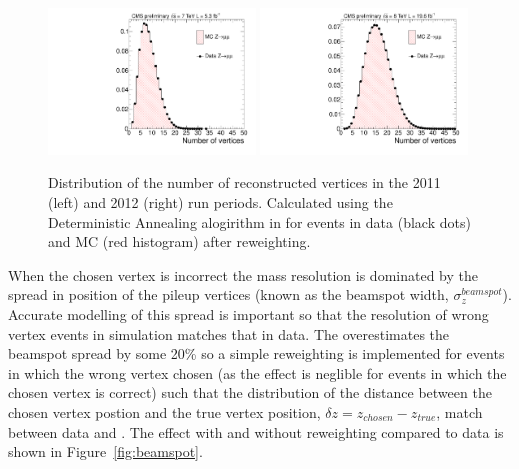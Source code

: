 \begin{figure}
  \begin{center}
  \includegraphics[width=0.49\textwidth]{analysis_comps/plots/nvtx_zmumu_2011.pdf}
  \includegraphics[width=0.49\textwidth]{analysis_comps/plots/nvtx_zmumu_2012.pdf}
  \caption{Distribution of the number of reconstructed vertices in the 2011 (left) and 2012 (right) run periods. Calculated using the Deterministic Annealing alogirithm in  for \Zmumu events in data (black dots) and MC (red histogram) after reweighting.}
  \label{fig:pileup}
  \end{center}
\end{figure}

When the chosen vertex is incorrect the mass resolution is dominated by the spread in position of the pileup vertices (known as the beamspot width, $\sigma_{z}^{beamspot}$). Accurate modelling of this spread is important so that the resolution of wrong vertex events in simulation matches that in data. The \MC overestimates the beamspot spread by some 20\% so a simple reweighting is implemented for \MC events in which the wrong vertex chosen (as the effect is neglible for events in which the chosen vertex is correct) such that the distribution of the distance between the chosen vertex postion and the true vertex position, $\delta z=z_{chosen}-z_{true}$, match between data and \MC. The effect with and without reweighting compared to data is shown in Figure~\ref{fig:beamspot}.

